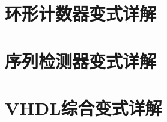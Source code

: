 \documentclass[12pt,a4paper,openany]{ctexbook}
\begin{document}
\part{环形计数器变式详解}


\part{序列检测器变式详解}


\part{VHDL综合变式详解}

\end{document}
